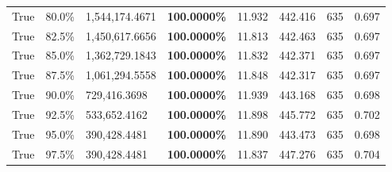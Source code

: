 \begin{table}[H]
\begin{tabular}{lllrllll}
\cline{1-8}
True & 80.0\% & 1,544,174.4671 & \bfseries \color{red} 100.0000\% & 11.932 & 442.416 & 635 & 0.697 \\
\cline{1-8}
True & 82.5\% & 1,450,617.6656 & \bfseries \color{red} 100.0000\% & 11.813 & 442.463 & 635 & 0.697 \\
\cline{1-8}
True & 85.0\% & 1,362,729.1843 & \bfseries \color{red} 100.0000\% & 11.832 & 442.371 & 635 & 0.697 \\
\cline{1-8}
True & 87.5\% & 1,061,294.5558 & \bfseries \color{red} 100.0000\% & 11.848 & 442.317 & 635 & 0.697 \\
\cline{1-8}
True & 90.0\% & 729,416.3698 & \bfseries \color{red} 100.0000\% & 11.939 & 443.168 & 635 & 0.698 \\
\cline{1-8}
True & 92.5\% & 533,652.4162 & \bfseries \color{red} 100.0000\% & 11.898 & 445.772 & 635 & 0.702 \\
\cline{1-8}
True & 95.0\% & 390,428.4481 & \bfseries \color{red} 100.0000\% & 11.890 & 443.473 & 635 & 0.698 \\
\cline{1-8}
True & 97.5\% & 390,428.4481 & \bfseries \color{red} 100.0000\% & 11.837 & 447.276 & 635 & 0.704 \\
\cline{1-8}
\bottomrule
\end{tabular}
\end{table}
